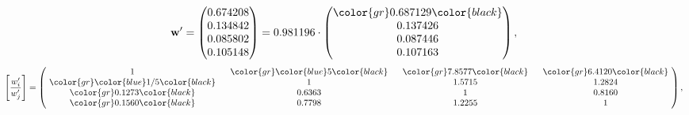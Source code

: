 \begin{example}
\begin{equation*}
\mathbf{w}^{\prime} =
\begin{pmatrix}
0.674208\\
0.134842\\
0.085802\\
0.105148
\end{pmatrix} =
0.981196\cdot
\begin{pmatrix}
\color{gr} 0.687129\color{black} \\
0.137426\\
0.087446\\
0.107163
\end{pmatrix},
\end{equation*}
\begin{equation*}
\left[ \frac{{w}^{\prime}_i}{{w}^{\prime}_j} \right] =
\begin{pmatrix}
$\,\,$ 1 $\,\,$ & $\,\,$\color{gr} \color{blue} 5\color{black} $\,\,$ & $\,\,$\color{gr} 7.8577\color{black} $\,\,$ & $\,\,$\color{gr} 6.4120\color{black} $\,\,$ \\
$\,\,$\color{gr} \color{blue}  1/5\color{black} $\,\,$ & $\,\,$ 1 $\,\,$ & $\,\,$1.5715$\,\,$ & $\,\,$1.2824  $\,\,$ \\
$\,\,$\color{gr} 0.1273\color{black} $\,\,$ & $\,\,$0.6363$\,\,$ & $\,\,$ 1 $\,\,$ & $\,\,$0.8160 $\,\,$ \\
$\,\,$\color{gr} 0.1560\color{black} $\,\,$ & $\,\,$0.7798$\,\,$ & $\,\,$1.2255$\,\,$ & $\,\,$ 1  $\,\,$ \\
\end{pmatrix},
\end{equation*}
\end{example}
\newpage
